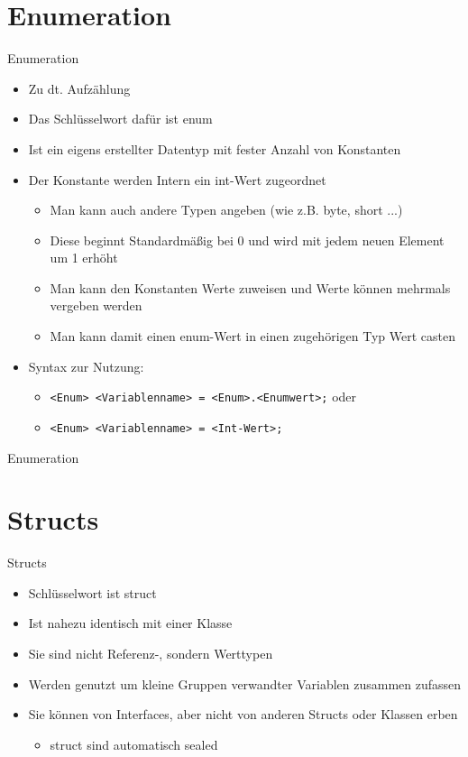 \section{Enumeration}
\begin{frame}{Enumeration}
	\begin{itemize}
		\item Zu dt. Aufzählung
		\item Das Schlüsselwort dafür ist \alert{enum}
		\item Ist ein eigens erstellter Datentyp mit fester Anzahl von Konstanten
		\item Der Konstante werden Intern ein \alert{int}-Wert zugeordnet
		\begin{itemize}
			\item Man kann auch andere Typen angeben (wie z.B. \alert{byte}, \alert{short} ...)
			\item Diese beginnt Standardmäßig bei 0 und wird mit jedem neuen Element um 1 erhöht
			\item Man kann den Konstanten Werte zuweisen und Werte können mehrmals vergeben werden
			\item Man kann damit einen \alert{enum}-Wert in einen zugehörigen Typ Wert casten			
		\end{itemize}
		\item Syntax zur Nutzung:
		\begin{itemize}
			\item \texttt{\alert{<Enum> <Variablenname>} = \alert{<Enum>}.\alert{<Enumwert>};} oder
			\item \texttt{\alert{<Enum> <Variablenname>} = \alert{<Int-Wert>};}
		\end{itemize}
	\end{itemize}
\end{frame}

\begin{frame}{Enumeration}
	
	
\end{frame}

\section{Structs}
\begin{frame}{Structs}
	\begin{itemize}
		\item Schlüsselwort ist \alert{struct}
		\item Ist nahezu identisch mit einer Klasse
		\item Sie sind nicht Referenz-, sondern Werttypen
		\item Werden genutzt um kleine Gruppen verwandter Variablen zusammen zufassen
		\item Sie können von Interfaces, aber nicht von anderen Structs oder Klassen erben 
		\begin{itemize}
			\item \alert{struct} sind automatisch \alert{sealed}
		\end{itemize}
	\end{itemize}
\end{frame}

